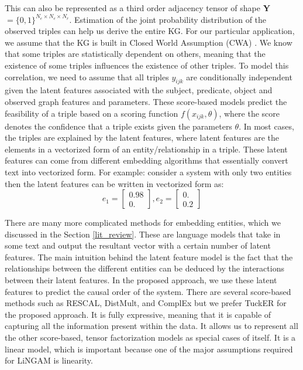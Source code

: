 \documentclass{article}
\begin{document}
This can also be represented as a third order adjacency tensor of shape \textbf{Y}$=\{0,1\}^{N_e \times N_e \times N_r}$. Estimation of the joint probability distribution of the observed triples can help us derive the entire KG. For our particular application, we assume that the KG is built in Closed World Assumption (CWA) \cite{minker1982indefinite}.
We know that some triples are statistically dependent on others, meaning that the existence of some triples influences the existence of other triples. To model this correlation, we need to assume that all triples $y_{ijk}$ are conditionally independent given the latent features associated with the subject, predicate, object and observed graph features and parameters. These score-based models predict the feasibility of a triple based on a scoring function $f(x_{ijk}, \theta)$, where the score denotes the confidence that a triple exists given the parameters $\theta$. In most cases, the triples are explained by the latent features, where latent features are the elements in a vectorized form of an entity/relationship in a triple. These latent features can come from different embedding algorithms that essentially convert text into vectorized form. For example: consider a system with only two entities then the latent features can be written in vectorized form as:
\begin{equation}
    e_1 =
    \begin{bmatrix}
    0.98\\
    0.
    \end{bmatrix},
    e_2 = 
    \begin{bmatrix}
    0.\\
    0.2
    \end{bmatrix}
\end{equation}

There are many more complicated methods for embedding entities, which we discussed in the Section \ref{lit_review}. These are language models that take in some text and output the resultant vector with a certain number of latent features.
The main intuition behind the latent feature model is the fact that the relationships between the different entities can be deduced by the interactions between their latent features.
In the proposed approach, we use these latent features to predict the causal order of the system.
There are several score-based methods such as RESCAL, DistMult, and ComplEx  but we prefer TuckER for the proposed approach. It is fully expressive, meaning that it is capable of capturing all the information present within the data. It allows us to represent all the other score-based, tensor factorization models as special cases of itself. It is a linear model, which is important because one of the major assumptions required for LiNGAM is linearity.
\end{document}
